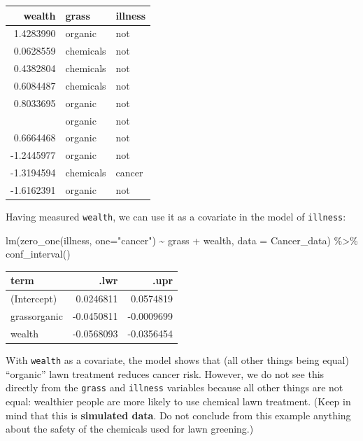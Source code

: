 \documentclass[
  letterpaper,
  DIV=11,
  numbers=noendperiod,
  oneside]{scrreprt}
\newenvironment{Shaded}{\begin{snugshade}}{\end{snugshade}}
\newcommand{\AttributeTok}[1]{\textcolor[rgb]{0.40,0.45,0.13}{#1}}
\newcommand{\FunctionTok}[1]{\textcolor[rgb]{0.28,0.35,0.67}{#1}}
\newcommand{\NormalTok}[1]{\textcolor[rgb]{0.00,0.23,0.31}{#1}}
\newcommand{\SpecialCharTok}[1]{\textcolor[rgb]{0.37,0.37,0.37}{#1}}
\newcommand{\StringTok}[1]{\textcolor[rgb]{0.13,0.47,0.30}{#1}}
\begin{document}
\ttfamily 
\begin{tabular}{rll}
\toprule
wealth & grass & illness\\
\midrule
1.4283990 & organic & not\\
0.0628559 & chemicals & not\\
0.4382804 & chemicals & not\\
0.6084487 & chemicals & not\\
0.8033695 & organic & not\\
\addlinespace
-0.9367287 & organic & not\\
0.6664468 & organic & not\\
-1.2445977 & organic & not\\
-1.3194594 & chemicals & cancer\\
-1.6162391 & organic & not\\
\bottomrule
\end{tabular} \normalfont
\bigskip

Having measured \texttt{wealth}, we can use it as a covariate in the
model of \texttt{illness}:

\begin{Shaded}
\begin{Highlighting}[]
\FunctionTok{lm}\NormalTok{(}\FunctionTok{zero\_one}\NormalTok{(illness, }\AttributeTok{one=}\StringTok{"cancer"}\NormalTok{) }\SpecialCharTok{\textasciitilde{}}\NormalTok{ grass }\SpecialCharTok{+}\NormalTok{ wealth, }\AttributeTok{data =}\NormalTok{ Cancer\_data) }\SpecialCharTok{\%\textgreater{}\%}
  \FunctionTok{conf\_interval}\NormalTok{()}
\end{Highlighting}
\end{Shaded}

\ttfamily 
\begin{tabular}{lrr}
\toprule
term & .lwr & .upr\\
\midrule
(Intercept) & 0.0246811 & 0.0574819\\
grassorganic & -0.0450811 & -0.0009699\\
wealth & -0.0568093 & -0.0356454\\
\bottomrule
\end{tabular} \normalfont
\bigskip

With \texttt{wealth} as a covariate, the model shows that (all other
things being equal) ``organic'' lawn treatment reduces cancer risk.
However, we do not see this directly from the \texttt{grass} and
\texttt{illness} variables because all other things are not equal:
wealthier people are more likely to use chemical lawn treatment. (Keep
in mind that this is \textbf{simulated data}. Do not conclude from this
example anything about the safety of the chemicals used for lawn
greening.)
\end{document}

